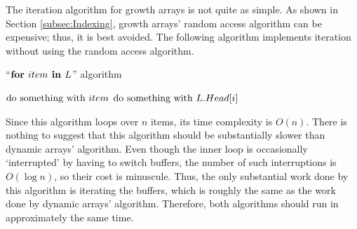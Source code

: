 \HdrGrowthArrayImpl

The iteration algorithm for growth arrays is not quite as simple. As shown in Section \ref{subsec:Indexing}, growth arrays' random access algorithm can be expensive; thus, it is best avoided. The following algorithm implements iteration without using the random access algorithm.

\begin{algorithm}[H]
	\caption{``$\textbf{for } item \textbf{ in } L$'' algorithm \TextGrowthArray}
	\begin{algorithmic}
			\For{$\LclItem \TextIn \LclBuffer$}
				\State $\text{do something with } item$
			\EndFor
		\EndFor
			\State $\text{do something with } L.Head[i]$
		\EndFor
	\end{algorithmic}
\end{algorithm}

Since this algorithm loops over $n$ items, its time complexity is $O(n)$. There is nothing to suggest that this algorithm should be substantially slower than dynamic arrays' algorithm. Even though the inner loop is occasionally `interrupted' by having to switch buffers, the number of such interruptions is $O(\log n)$, so their cost is minuscule. Thus, the only substantial work done by this algorithm is iterating the buffers, which is roughly the same as the work done by dynamic arrays' algorithm. Therefore, both algorithms should run in approximately the same time.